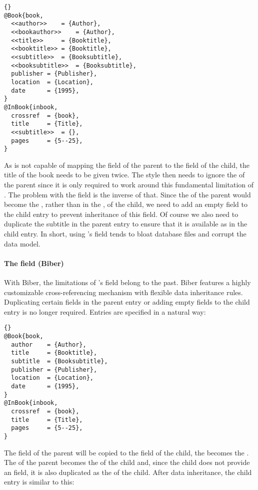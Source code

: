 \documentclass{ltxdockit}[2011/03/25]
\newcommand*{\biber}{Biber\xspace}
\begin{document}
\begin{lstlisting}[style=bibtex]{}
@Book{book,
  <<author>>	= {Author},
  <<bookauthor>>	= {Author},
  <<title>>		= {Booktitle},
  <<booktitle>>	= {Booktitle},
  <<subtitle>>	= {Booksubtitle},
  <<booksubtitle>>	= {Booksubtitle},
  publisher	= {Publisher},
  location	= {Location},
  date		= {1995},
}
@InBook{inbook,
  crossref	= {book},
  title		= {Title},
  <<subtitle>>	= {},
  pages		= {5--25},
}
\end{lstlisting}
%
As \bibtex is not capable of mapping the  field of the parent to the  field of the child, the title of the book needs to be given twice. The style then needs to ignore the  of the parent since it is only required to work around this fundamental limitation of \bibtex. The problem with the  field is the inverse of that. Since the  of the parent would become the , rather than in the , of the child, we need to add an empty  field to the child entry to prevent inheritance of this field. Of course we also need to duplicate the subtitle in the parent entry to ensure that it is available as  in the child entry. In short, using \bibtex's  field tends to bloat database files and corrupt the data model.

\paragraph{The  field (\biber)}
\label{bib:cav:ref:bbr}

With \biber, the limitations of \bibtex's  field belong to the past. \biber features a highly customizable cross-referencing mechanism with flexible data inheritance rules. Duplicating certain fields in the parent entry or adding empty fields to the child entry is no longer required. Entries are specified in a natural way:

\begin{lstlisting}[style=bibtex]{}
@Book{book,
  author	= {Author},
  title		= {Booktitle},
  subtitle	= {Booksubtitle},
  publisher	= {Publisher},
  location	= {Location},
  date		= {1995},
}
@InBook{inbook,
  crossref	= {book},
  title		= {Title},
  pages		= {5--25},
}
\end{lstlisting}
%
The  field of the parent will be copied to the  field of the child, the  becomes the . The  of the parent becomes the  of the child and, since the child does not provide an  field, it is also duplicated as the  of the child. After data inheritance, the child entry is similar to this:
\end{document}
